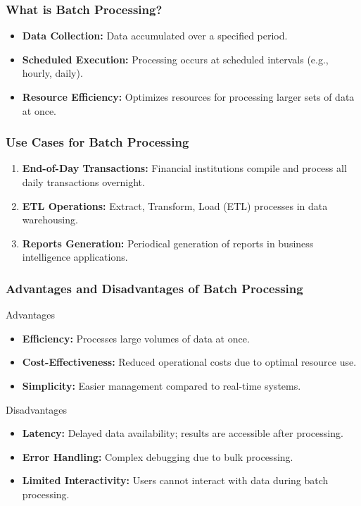 \documentclass[aspectratio=169]{beamer}
\begin{document}
\begin{frame}[fragile]
    \frametitle{What is Batch Processing?}
    \begin{itemize}
        \item \textbf{Data Collection:} Data accumulated over a specified period.
        \item \textbf{Scheduled Execution:} Processing occurs at scheduled intervals (e.g., hourly, daily).
        \item \textbf{Resource Efficiency:} Optimizes resources for processing larger sets of data at once.
    \end{itemize}
\end{frame}

\begin{frame}[fragile]
    \frametitle{Use Cases for Batch Processing}
    \begin{enumerate}
        \item \textbf{End-of-Day Transactions:} Financial institutions compile and process all daily transactions overnight.
        \item \textbf{ETL Operations:} Extract, Transform, Load (ETL) processes in data warehousing.
        \item \textbf{Reports Generation:} Periodical generation of reports in business intelligence applications.
    \end{enumerate}
\end{frame}

\begin{frame}[fragile]
    \frametitle{Advantages and Disadvantages of Batch Processing}
    \begin{block}{Advantages}
        \begin{itemize}
            \item \textbf{Efficiency:} Processes large volumes of data at once.
            \item \textbf{Cost-Effectiveness:} Reduced operational costs due to optimal resource use.
            \item \textbf{Simplicity:} Easier management compared to real-time systems.
        \end{itemize}
    \end{block}
    
    \begin{block}{Disadvantages}
        \begin{itemize}
            \item \textbf{Latency:} Delayed data availability; results are accessible after processing.
            \item \textbf{Error Handling:} Complex debugging due to bulk processing.
            \item \textbf{Limited Interactivity:} Users cannot interact with data during batch processing.
        \end{itemize}
    \end{block}
\end{frame}
\end{document}
